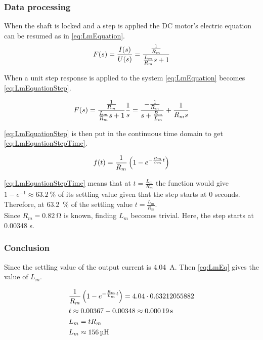 \newpage
\subsubsection*{Data processing}
When the shaft is locked and a step is applied the DC motor's electric equation can be resumed as in \autoref{eq:LmEquation}.
\begin{equation}
	F(s)=\frac{I(s)}{U(s)}=\frac{\frac{1}{R_m}}{\frac{L_m}{R_m} s+1} \addunit{1}
	\label{eq:LmEquation}
\end{equation}
\startexplain
{}
\stopexplain

When a unit step response is applied to the system \autoref{eq:LmEquation} becomes \autoref{eq:LmEquationStep}.

\begin{equation}
F(s)=\frac{\frac{1}{R_m}}{\frac{L_m}{R_m} s+1}\frac{1}{s}=\frac{-\frac{1}{R_m}}{s+\frac{R_m}{L_m}}+\frac{1}{R_m s} \addunit{1}
\label{eq:LmEquationStep}
\end{equation}

\autoref{eq:LmEquationStep} is then put in the continuous time domain to get \autoref{eq:LmEquationStepTime}.

\begin{equation}
f(t)= \frac{1}{R_m} \left(1-e^{-\frac{R_m}{L_m} t}\right) \addunit{1}
\label{eq:LmEquationStepTime}
\end{equation}

\autoref{eq:LmEquationStepTime} means that at $t=\frac{L_m}{R_m}$ the function would give $1-e^{-1} \approx \SI{63.2}{\percent}$ of its settling value given that the step starts at 0 seconds. Therefore, at \SI{63.2}{\percent} of the settling value $t=\frac{L_m}{R_m}$. \\
Since $R_m=\SI{0.82}{\ohm}$ is known, finding $L_m$ becomes trivial. Here, the step starts at 0.00348 s.

\subsubsection*{Conclusion}

Since the settling value of the output current is \SI{4.04}{\ampere}. Then \autoref{eq:LmEq} gives the value of $L_m$.

\begin{subequations} \label{eq:LmEq}
	\begin{flalign}
		&\frac{1}{R_m} \left(1-e^{-\frac{R_m}{L_m} t}\right) = 4.04 \cdot 0.63212055882 \addunit{\second} \\
		&t \approx 0.00367 - 0.00348 \approx \SI{0.00019}{\second} \\
		&L_m=tR_m \\
		&L_m \approx \SI{156}{\micro\henry}
	\end{flalign}
\end{subequations}

